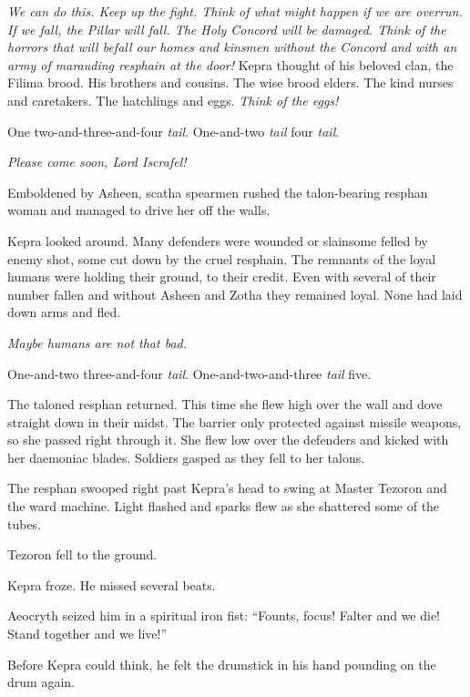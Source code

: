 \documentclass
  [a4paper,
   12pt,
   oneside
  ]%
  {article}
\newcommand{\drum}[1]{\textsf{#1}}
\begin{document}
\emph{
    We can do this.
    Keep up the fight. Think of what might happen if we are overrun. If we fall, the Pillar will fall. The Holy Concord will be damaged. 
    Think of the horrors that will befall our homes and kinsmen without the Concord and with an army of marauding resphain at the door!%
} 
Kepra thought of his beloved clan, the Filima brood. His brothers and cousins. The wise brood elders. The kind nurses and caretakers. The hatchlings and eggs. 
\emph{Think of the eggs!}

\drum{One two-and-three-and-four \emph{tail}. One-and-two \emph{tail} four \emph{tail}.}

\emph{Please come soon, Lord Iscrafel!}

Emboldened by Asheen, scatha spearmen rushed the talon-bearing resphan woman and managed to drive her off the walls. 

Kepra looked around. Many defenders were wounded or slain\dash{}some felled by enemy shot, some cut down by the cruel resphain. 
The remnants of the loyal humans were holding their ground, to their credit. 
Even with several of their number fallen and without Asheen and Zotha they remained loyal. None had laid down arms and fled. 

\emph{Maybe humans are not that bad.}

\drum{One-and-two three-and-four \emph{tail}. One-and-two-and-three \emph{tail} five.}

The taloned resphan returned. This time she flew high over the wall and dove straight down in their midst. 
The barrier only protected against missile weapons, so she passed right through it. 
She flew low over the defenders and kicked with her daemoniac blades. 
Soldiers gasped as they fell to her talons.

The resphan swooped right past Kepra’s head to swing at Master Tezoron and the ward machine. 
Light flashed and sparks flew as she shattered some of the tubes. 

Tezoron fell to the ground. 

Kepra froze. He missed several beats. 

Aeocryth seized him in a spiritual iron fist: 
``Founts, focus! Falter and we die! Stand together and we live!'' 

Before Kepra could think, he felt the drumstick in his hand pounding on the drum again. 
\end{document}

